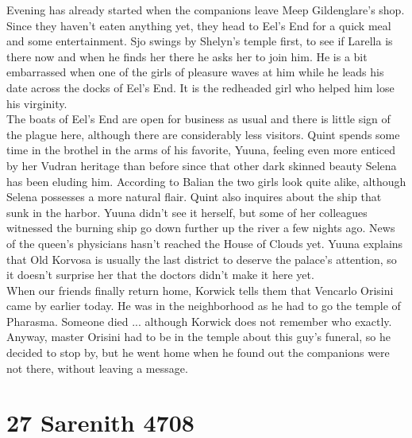 Evening has already started when the companions leave Meep Gildenglare's shop. Since they haven't eaten anything yet, they head to Eel's End for a quick meal and some entertainment. Sjo swings by Shelyn's temple first, to see if Larella is there now and when he finds her there he asks her to join him. He is a bit embarrassed when one of the girls of pleasure waves at him while he leads his date across the docks of Eel's End. It is the redheaded girl who helped him lose his virginity.\\

The boats of Eel's End are open for business as usual and there is little sign of the plague here, although there are considerably less visitors. Quint spends some time in the brothel in the arms of his favorite, Yuuna, feeling even more enticed by her Vudran heritage than before since that other dark skinned beauty Selena has been eluding him. According to Balian the two girls look quite alike, although Selena possesses a more natural flair. Quint also inquires about the ship that sunk in the harbor. Yuuna didn't see it herself, but some of her colleagues witnessed the burning ship go down further up the river a few nights ago. News of the queen's physicians hasn't reached the House of Clouds yet. Yuuna explains that Old Korvosa is usually the last district to deserve the palace's attention, so it doesn't surprise her that the doctors didn't make it here yet.\\

When our friends finally return home, Korwick tells them that Vencarlo Orisini came by earlier today. He was in the neighborhood as he had to go the temple of Pharasma. Someone died ... although Korwick does not remember who exactly. Anyway, master Orisini had to be in the temple about this guy's funeral, so he decided to stop by, but he went home when he found out the companions were not there, without leaving a message.\\

\section{27 Sarenith 4708}

